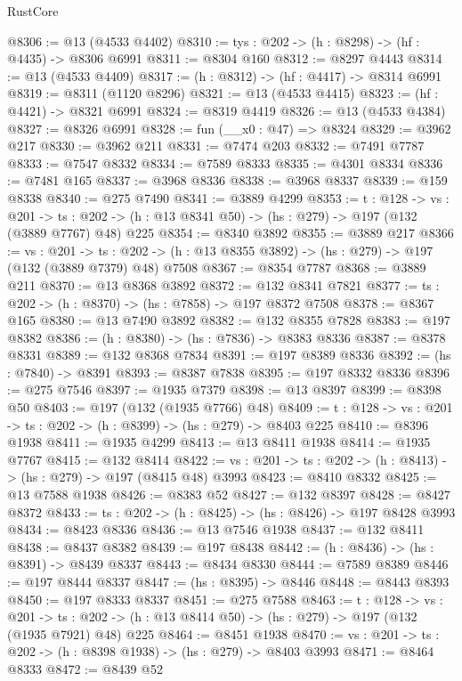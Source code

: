 \begin{lexlean}{RustCore}
\begin{coremodule}
@8306 := @13 (@4533 @4402)
@8310 := {tys : @202} -> (h : @8298) -> (hf : @4435) -> @8306 @6991
@8311 := @8304 @160
@8312 := @8297 @4443
@8314 := @13 (@4533 @4409)
@8317 := (h : @8312) -> (hf : @4417) -> @8314 @6991
@8319 := @8311 (@1120 @8296)
@8321 := @13 (@4533 @4415)
@8323 := (hf : @4421) -> @8321 @6991
@8324 := @8319 @4419
@8326 := @13 (@4533 @4384)
@8327 := @8326 @6991
@8328 := fun (__x0 : @47) => @8324
@8329 := @3962 @217
@8330 := @3962 @211
@8331 := @7474 @203
@8332 := @7491 @7787
@8333 := @7547 @8332
@8334 := @7589 @8333
@8335 := @4301 @8334
@8336 := @7481 @165
@8337 := @3968 @8336
@8338 := @3968 @8337
@8339 := @159 @8338
@8340 := @275 @7490
@8341 := @3889 @4299
@8353 := {t : @128} ->
  {vs : @201} ->
  {ts : @202} -> (h : @13 @8341 @50) -> (hs : @279) -> @197 (@132 (@3889 @7767) @48) @225
@8354 := @8340 @3892
@8355 := @3889 @217
@8366 := {vs : @201} ->
  {ts : @202} -> (h : @13 @8355 @3892) -> (hs : @279) -> @197 (@132 (@3889 @7379) @48) @7508
@8367 := @8354 @7787
@8368 := @3889 @211
@8370 := @13 @8368 @3892
@8372 := @132 @8341 @7821
@8377 := {ts : @202} -> (h : @8370) -> (hs : @7858) -> @197 @8372 @7508
@8378 := @8367 @165
@8380 := @13 @7490 @3892
@8382 := @132 @8355 @7828
@8383 := @197 @8382
@8386 := (h : @8380) -> (hs : @7836) -> @8383 @8336
@8387 := @8378 @8331
@8389 := @132 @8368 @7834
@8391 := @197 @8389 @8336
@8392 := (hs : @7840) -> @8391
@8393 := @8387 @7838
@8395 := @197 @8332 @8336
@8396 := @275 @7546
@8397 := @1935 @7379
@8398 := @13 @8397
@8399 := @8398 @50
@8403 := @197 (@132 (@1935 @7766) @48)
@8409 := {t : @128} -> {vs : @201} -> {ts : @202} -> (h : @8399) -> (hs : @279) -> @8403 @225
@8410 := @8396 @1938
@8411 := @1935 @4299
@8413 := @13 @8411 @1938
@8414 := @1935 @7767
@8415 := @132 @8414
@8422 := {vs : @201} -> {ts : @202} -> (h : @8413) -> (hs : @279) -> @197 (@8415 @48) @3993
@8423 := @8410 @8332
@8425 := @13 @7588 @1938
@8426 := @8383 @52
@8427 := @132 @8397
@8428 := @8427 @8372
@8433 := {ts : @202} -> (h : @8425) -> (hs : @8426) -> @197 @8428 @3993
@8434 := @8423 @8336
@8436 := @13 @7546 @1938
@8437 := @132 @8411
@8438 := @8437 @8382
@8439 := @197 @8438
@8442 := (h : @8436) -> (hs : @8391) -> @8439 @8337
@8443 := @8434 @8330
@8444 := @7589 @8389
@8446 := @197 @8444 @8337
@8447 := (hs : @8395) -> @8446
@8448 := @8443 @8393
@8450 := @197 @8333 @8337
@8451 := @275 @7588
@8463 := {t : @128} ->
  {vs : @201} ->
  {ts : @202} -> (h : @13 @8414 @50) -> (hs : @279) -> @197 (@132 (@1935 @7921) @48) @225
@8464 := @8451 @1938
@8470 := {vs : @201} -> {ts : @202} -> (h : @8398 @1938) -> (hs : @279) -> @8403 @3993
@8471 := @8464 @8333
@8472 := @8439 @52

\end{coremodule}
\end{lexlean}
